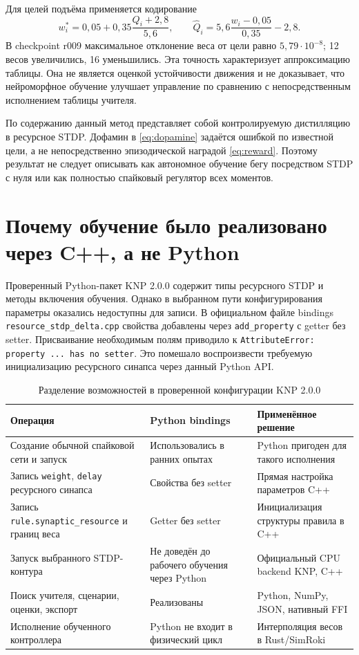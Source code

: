 \documentclass[11pt,a4paper]{article}
\newcommand{\code}[1]{\texttt{#1}}
\begin{document}
Для целей подъёма применяется кодирование
\begin{equation}
 w_i^*=0{,}05+0{,}35\frac{Q_i+2{,}8}{5{,}6},
 \qquad
 \widehat Q_i=5{,}6\frac{w_i-0{,}05}{0{,}35}-2{,}8.
 \label{eq:encoding}
\end{equation}
В checkpoint r009 максимальное отклонение веса от цели равно $5{,}79\cdot10^{-8}$; 12 весов увеличились, 16 уменьшились. Эта точность характеризует аппроксимацию таблицы. Она не является оценкой устойчивости движения и не доказывает, что нейроморфное обучение улучшает управление по сравнению с непосредственным исполнением таблицы учителя.

По содержанию данный метод представляет собой контролируемую дистилляцию в ресурсное STDP. Дофамин в \eqref{eq:dopamine} задаётся ошибкой по известной цели, а не непосредственно эпизодической наградой \eqref{eq:reward}. Поэтому результат не следует описывать как автономное обучение бегу посредством STDP с нуля или как полностью спайковый регулятор всех моментов.

\section{Почему обучение было реализовано через C++, а не Python}
Проверенный Python-пакет KNP 2.0.0 содержит типы ресурсного STDP и методы включения обучения. Однако в выбранном пути конфигурирования параметры оказались недоступны для записи. В официальном файле bindings \code{resource\_stdp\_delta.cpp} \cite{bindings} свойства добавлены через \code{add\_property} с getter без setter. Присваивание необходимым полям приводило к \code{AttributeError: property ... has no setter}. Это помешало воспроизвести требуемую инициализацию ресурсного синапса через данный Python API.

\begin{table}[htbp]\centering\small
\caption{Разделение возможностей в проверенной конфигурации KNP 2.0.0}
\begin{tabularx}{\textwidth}{@{}>{\raggedright\arraybackslash}p{}>{\raggedright\arraybackslash}X>{\raggedright\arraybackslash}X@{}}\toprule
Операция & Python bindings & Применённое решение \\\midrule
Создание обычной спайковой сети и запуск & Использовались в ранних опытах & Python пригоден для такого исполнения \\
Запись \code{weight}, \code{delay} ресурсного синапса & Свойства без setter & Прямая настройка параметров C++ \\
Запись \code{rule.synaptic\_resource} и границ веса & Getter без setter & Инициализация структуры правила в C++ \\
Запуск выбранного STDP-контура & Не доведён до рабочего обучения через Python & Официальный CPU backend KNP, C++ \\
Поиск учителя, сценарии, оценки, экспорт & Реализованы & Python, NumPy, JSON, нативный FFI \\
Исполнение обученного контроллера & Python не входит в физический цикл & Интерполяция весов в Rust/SimRoki \\\bottomrule
\end{tabularx}
\label{tab:python}
\end{table}
\end{document}
